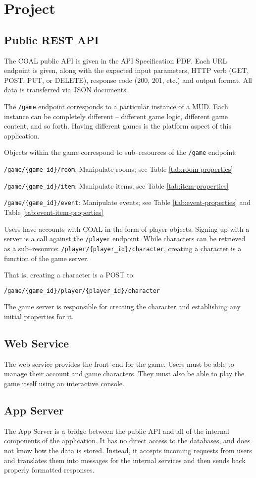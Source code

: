 \documentclass{article}
\newcommand{\enterProblemHeader}[1]{
}
\newcommand{\exitProblemHeader}[1]{
\nobreak\extramarks{#1}{}\nobreak
}
\newcounter{homeworkProblemCounter} %
\newcommand{\homeworkProblemName}{}
\newenvironment{homeworkProblem}[1][Problem \arabic{homeworkProblemCounter}]{ %
\stepcounter{homeworkProblemCounter} %
\renewcommand{\homeworkProblemName}{#1} %
\section{\homeworkProblemName} %
\enterProblemHeader{\homeworkProblemName} %
}{
\exitProblemHeader{\homeworkProblemName} %
}
\newcommand{\homeworkSectionName}{}
\newenvironment{homeworkSection}[1]{ %
\renewcommand{\homeworkSectionName}{#1} %
\subsection{\homeworkSectionName} %
\enterProblemHeader{\homeworkProblemName\ [\homeworkSectionName]} %
}{
\enterProblemHeader{\homeworkProblemName} %
}
\begin{document}
\begin{homeworkProblem}[Project]
\begin{homeworkSection}{Public REST API}
	The COAL public API is given in the API Specification PDF. Each URL endpoint is given, along with the expected input parameters, HTTP verb (GET, POST, PUT, or DELETE),  response code (200, 201, etc.) and output format. All data is transferred via JSON documents.

	The \texttt{/game} endpoint corresponds to a particular instance of a MUD. Each instance can be completely different -- different game logic, different game content, and so forth. Having different games is the platform aspect of this application.

	Objects within the game correspond to sub--resources of the \texttt{/game} endpoint:
	\begin{compactitem}
		\item \texttt{/game/\{game\_id\}/room}: Manipulate rooms; see Table \ref{tab:room-properties}
		\item \texttt{/game/\{game\_id\}/item}: Manipulate items; see Table \ref{tab:item-properties}
		\item \texttt{/game/\{game\_id\}/event}: Manipulate events; see Table \ref{tab:event-properties} and Table \ref{tab:event-item-properties}
	\end{compactitem}
	
	Users have accounts with COAL in the form of player objects. Signing up with a server is a call against the \texttt{/player} endpoint. While characters can be retrieved as a sub--resource: \texttt{/player/\{player\_id\}/character}, creating a character is a function of the game server. 
	
	That is, creating a character is a POST to:
	 
	\texttt{/game/\{game\_id\}/player/\{player\_id\}/character} 
	
	The game server is responsible for creating the character and establishing any initial properties for it.
\end{homeworkSection}


\begin{homeworkSection}{Web Service}
	The web service provides the front--end for the game. Users must be able to manage their account and game characters. They must also be able to play the game itself using an interactive console.
\end{homeworkSection}


\begin{homeworkSection}{App Server}
	The App Server is a bridge between the public API and all of the internal components of the application. It has no direct access to the databases, and does not know how the data is stored. Instead, it accepts incoming requests from users and translates them into messages for the internal services and then sends back properly formatted responses.
	

\end{homeworkSection}
\end{homeworkProblem}
\end{document}
